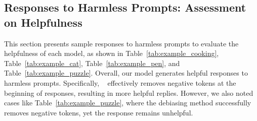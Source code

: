 \newpage
\subsection{Responses to Harmless Prompts: Assessment on Helpfulness}

This section presents sample responses to harmless prompts to evaluate the helpfulness of each model, as shown in Table~\ref{tab:example_cooking}, Table~\ref{tab:example_cat}, Table~\ref{tab:example_pen}, and Table~\ref{tab:example_puzzle}. Overall, our model generates helpful responses to harmless prompts. Specifically, \algoshort~ effectively removes negative tokens at the beginning of responses, resulting in more helpful replies. However, we also noted cases like Table~\ref{tab:example_puzzle}, where the debiasing method successfully removes negative tokens, yet the response remains unhelpful.

\vspace{15pt}

